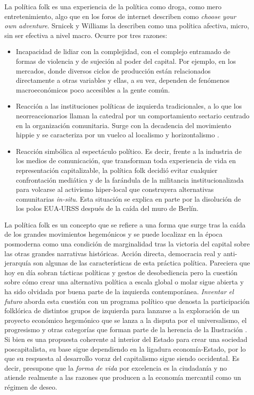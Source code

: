 La política folk es una experiencia de la política como droga, como mero entretenimiento, algo que en los foros de internet describen como \emph{choose your own adventure}. Srnicek y Williams la describen como una política afectiva, micro, sin ser efectiva a nivel macro. Ocurre por tres razones:

\begin{itemize}
  \item Incapacidad de lidiar con la complejidad, con el complejo entramado de formas de violencia y de sujeción al poder del capital. Por ejemplo, en los mercados, donde diversos ciclos de producción están relacionados directamente a otras variables y ellas, a su vez, dependen de fenómenos macroeconómicos poco accesibles a la gente común.
  \item Reacción a las instituciones políticas de izquierda tradicionales, a lo que los neorreaccionarios llaman la catedral por un comportamiento sectario centrado en la organización comunitaria. Surge con la decadencia del movimiento hippie y se caracteriza por un vuelco al localismo y horizontalismo \autocite{TyrannyStucturelessness,TyrannyTyranny}. 
  \item Reacción simbólica al espectáculo político. Es decir, frente a la industria de los medios de comunicación, que transforman toda experiencia de vida en representación capitalizable, la política folk decidió evitar cualquier confrontación mediática y de la farándula de la militancia institucionalizada para volcarse al activismo hiper-local que construyera alternativas comunitarias \emph{in-situ}. Esta situación se explica en parte por la disolución de los polos EUA-URSS después de la caída del muro de Berlín.
\end{itemize}

La política folk es un concepto que se refiere a una forma que surge tras la caída de los grandes movimientos hegemónicos y se puede localizar en la época posmoderna como una condición de marginalidad tras la victoria del capital sobre las otras grandes narrativas históricas. Acción directa, democracia real y anti-jerarquía son algunas de las características de esta práctica política. Pareciera que hoy en día sobran tácticas políticas y gestos de desobediencia pero la cuestión sobre cómo crear una alternativa política a escala global o molar sigue abierta y ha sido olvidada por buena parte de la izquierda contemporánea. \emph{Inventar el futuro} aborda esta cuestión con un programa político que denosta la participación folklórica de distintos grupos de izquierda para lanzarse a la exploración de un proyecto económico hegemónico que se lanza a la disputa por el universalismo, el progresismo y otras categorías que forman parte de la herencia de la Ilustración \autocite[p.~14]{srnicekInventarFuturoPoscapitalismo2017}. Si bien es una propuesta coherente al interior del Estado para crear una sociedad poscapitalista, su base sigue dependiendo en la ligadura economía-Estado, por lo que su respuesta al desarrollo voraz del capitalismo sigue siendo occidental. Es decir, presupone que la \emph{forma de vida} por excelencia es la ciudadanía y no atiende realmente a las razones que producen a la economía mercantil como un régimen de deseo.

